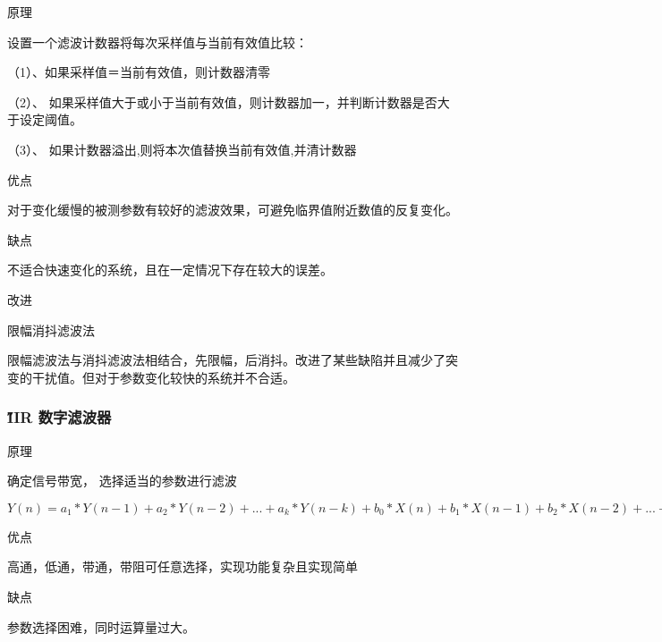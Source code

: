 \documentclass[12pt]{article} %
\begin{document}
		\begin{compactitem} 
 			\item 原理
 			\par 设置一个滤波计数器将每次采样值与当前有效值比较：
   			\par （1）、如果采样值＝当前有效值，则计数器清零
                 \par（2）、 如果采样值大于或小于当前有效值，则计数器加一，并判断计数器是否大于设定阈值。
     			\par （3）、 如果计数器溢出,则将本次值替换当前有效值,并清计数器
			
			\item 优点
			\par 对于变化缓慢的被测参数有较好的滤波效果，可避免临界值附近数值的反复变化。
			
			\item 缺点
			\par 不适合快速变化的系统，且在一定情况下存在较大的误差。
 			\item 改进
 			\par 限幅消抖滤波法
 			\par 限幅滤波法与消抖滤波法相结合，先限幅，后消抖。改进了某些缺陷并且减少了突变的干扰值。但对于参数变化较快的系统并不合适。
			
		 \end{compactitem}	
		\subsubsection{\H IIR 数字滤波器 } 
 	
 		\begin{compactitem} 
 			\item 原理
 			\par 确定信号带宽， 选择适当的参数进行滤波
 			\par $Y(n) = a_1*Y(n-1) + a_2*Y(n-2) + ... + a_k*Y(n-k) + b_0*X(n) + b_1*X(n-1) + b_2*X(n-2) + ... + b_k*X(n-k)$
			
			\item 优点
			\par 高通，低通，带通，带阻可任意选择，实现功能复杂且实现简单
			
			\item 缺点
			\par 参数选择困难，同时运算量过大。
			
		 \end{compactitem}	
 	
\end{document}
